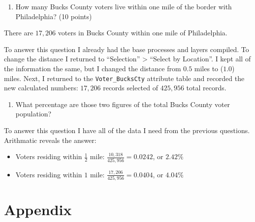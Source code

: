 \documentclass[]{article}
\providecommand{\tightlist}{%
  \setlength{\itemsep}{0pt}\setlength{\parskip}{0pt}}
\begin{document}
\begin{enumerate}
\def\labelenumi{\arabic{enumi}.}
\setcounter{enumi}{5}
\tightlist
\item
  How many Bucks County voters live within one mile of the border with
  Philadelphia? (10 points)
\end{enumerate}

There are \(17,206\) voters in Bucks County within one mile of
Philadelphia.

To answer this question I already had the base processes and layers
compiled. To change the distance I returned to ``Selection''
\textgreater{} ``Select by Location''. I kept all of the information the
same, but I changed the distance from \(0.5\) miles to (\(1.0\)) miles.
Next, I returned to the \texttt{Voter\_BucksCty} attribute table and
recorded the new calculated numbers: \(17,206\) records selected of
\(425,956\) total records.

\begin{enumerate}
\def\labelenumi{\arabic{enumi}.}
\setcounter{enumi}{6}
\tightlist
\item
  What percentage are those two figures of the total Bucks County voter
  population?
\end{enumerate}

To answer this question I have all of the data I need from the previous
questions. Arithmatic reveals the answer:

\begin{itemize}
\item
  Voters residing within \(\frac{1}{2}\) mile:
  \(\frac{10,318}{425,956} = 0.0242\), or \(2.42\%\)
\item
  Voters residing within \(1\) mile:
  \(\frac{17,206}{425,956} = 0.0404\), or \(4.04\%\)
\end{itemize}

\section{Appendix}\label{appendix}
\end{document}
